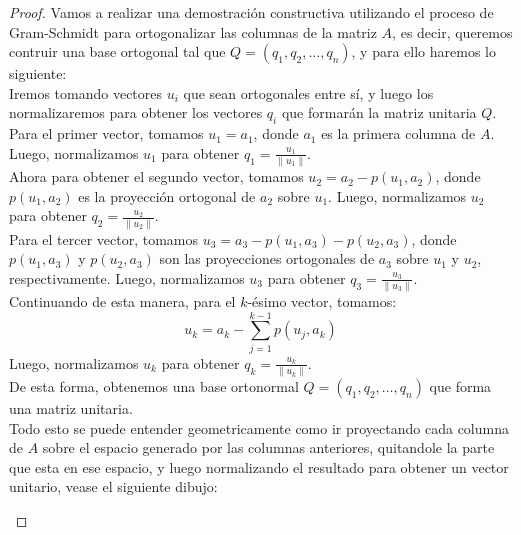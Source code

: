 \begin{proof}
    Vamos a realizar una demostración constructiva utilizando el proceso de Gram-Schmidt para ortogonalizar las columnas de la matriz $ A $, es decir, queremos contruir una base ortogonal tal que $Q = (q_1, q_2, \dots, q_n)$, y para ello haremos lo siguiente:\\
    Iremos tomando vectores $u_i$ que sean ortogonales entre sí, y luego los normalizaremos para obtener los vectores $q_i$ que formarán la matriz unitaria $Q$.\\
    Para el primer vector, tomamos $ u_1 = a_1 $, donde $a_1$ es la primera columna de $A$. Luego, normalizamos $u_1$ para obtener $ q_1 = \frac{u_1}{\|u_1\|} $.\\
    Ahora para obtener el segundo vector, tomamos $ u_2 = a_2 - p(u_1, a_2) $, donde $ p(u_1, a_2) $ es la proyección ortogonal de $ a_2 $ sobre $ u_1 $. Luego, normalizamos $ u_2 $ para obtener $ q_2 = \frac{u_2}{\|u_2\|} $.\\
    Para el tercer vector, tomamos $ u_3 = a_3 - p(u_1, a_3) - p(u_2, a_3) $, donde $ p(u_1, a_3) $ y $ p(u_2, a_3) $ son las proyecciones ortogonales de $ a_3 $ sobre $ u_1 $ y $ u_2 $, respectivamente. Luego, normalizamos $ u_3 $ para obtener $ q_3 = \frac{u_3}{\|u_3\|} $.\\
    Continuando de esta manera, para el $ k $-ésimo vector, tomamos:
    \[
        u_k = a_k - \sum_{j=1}^{k-1} p(u_j, a_k)
    \]
    Luego, normalizamos $ u_k $ para obtener $ q_k = \frac{u_k}{\|u_k\|} $.\\
    De esta forma, obtenemos una base ortonormal $ Q = (q_1, q_2, \dots, q_n) $ que forma una matriz unitaria.\\
    Todo esto se puede entender geometricamente como ir proyectando cada columna de $ A $ sobre el espacio generado por las columnas anteriores, quitandole la parte que esta en ese espacio, y luego normalizando el resultado para obtener un vector unitario, vease el siguiente dibujo:
    \begin{center}
\end{center}
\end{proof}
